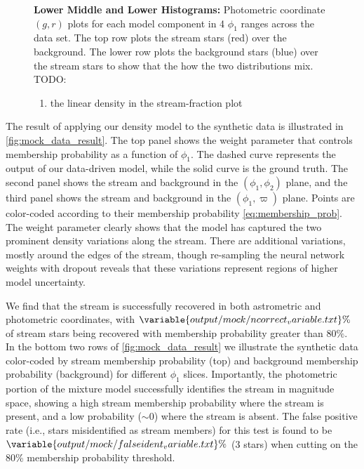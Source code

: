 \documentclass[twocolumn]{aastex631}
\newcommand{\parallax}{\varpi}
\begin{document}
\begin{figure*}
{                %
                \textbf{Lower Middle and Lower Histograms:}%
                    Photometric coordinate $(g, r)$ plots for each model
                    component in 4 $\phi_1$ ranges across the data set. The top
                    row plots the stream stars (red) over the background. The
                    lower row plots the background stars (blue) over the stream
                    stars to show that the how the two distributions mix.
            }
            \label{fig:mock_data_result}
            TODO:
            \begin{enumerate}
                \item the linear density in the stream-fraction plot
            \end{enumerate}
        \end{figure*}
    
        The result of applying our density model to the synthetic data is
        illustrated in \autoref{fig:mock_data_result}. The top panel shows the
        weight parameter that controls membership probability as a function of
        $\phi_1$. The dashed curve represents the output of our data-driven
        model, while the solid curve is the ground truth. The second panel shows
        the stream and background in the $(\phi_1,\phi_2)$ plane, and the third
        panel shows the stream and background in the $(\phi_1,\parallax)$ plane.
        Points are color-coded according to their membership probability
        \autoref{eq:membership_prob}. The weight parameter clearly shows that
        the model has captured the two prominent density variations along the
        stream.  There are additional variations, mostly around the edges of the
        stream, though re-sampling the neural network weights with dropout
        reveals that these variations represent regions of higher model
        uncertainty. 
    
        We find that the stream is successfully recovered in both astrometric
        and photometric coordinates, with
        $\variable{output/mock/ncorrect_variable.txt}\%$ of stream stars being
        recovered with membership probability greater than $80\%$.  In the
        bottom two rows of \autoref{fig:mock_data_result} we illustrate the
        synthetic data color-coded by stream membership probability (top) and
        background membership probability (background) for different $\phi_1$
        slices. Importantly, the photometric portion of the mixture model
        successfully identifies the stream in magnitude space, showing a high
        stream membership probability where the stream is present, and a low
        probability ($\sim 0$) where the stream is absent.  The false positive
        rate (i.e., stars misidentified as stream members) for this test is
        found to be $\variable{output/mock/falseident_variable.txt}\%$ (3 stars)
        when cutting on the 80\% membership probability threshold.
    
\end{document}
